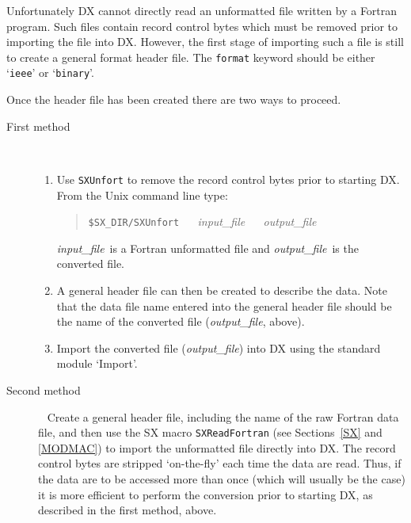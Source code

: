 Unfortunately DX cannot directly read an unformatted file written by
a Fortran program. Such files contain record control bytes which must
be  removed prior to importing the file into DX. However, the first
stage of importing such a file is still to create a general format
header file. The {\tt format} keyword should be either `{\tt ieee}'
or `{\tt binary}'.

Once the header file has been created there are two ways to proceed.

\pagebreak[4]
\begin{description}

  \item[First method] ~
  \begin{enumerate}

    \item Use {\tt SXUnfort} to remove the record control bytes prior
     to starting DX. From the Unix command line type:

    \begin{quote}
     {\tt \$SX\_DIR/SXUnfort} ~~ {\it input\_file} ~~ {\it output\_file}
    \end{quote}

     {\it input\_file}\, is a Fortran unformatted file and {\it
     output\_file}\, is the converted file.

    \item A general header file can then be created to describe the data.
     Note that the data file name entered into the general header
     file should be the name of the converted file ({\it{output\_file}},
     above).

    \item Import the converted file ({\it{output\_file}}) into DX using the
     standard module `Import'.

  \end{enumerate}

  \item[Second method] ~
  \newline Create a general header file, including the name of the raw
   Fortran data file, and then use the SX macro {\tt{SXReadFortran}}
   (see Sections~\ref{SX} and \ref{MODMAC}) to import the unformatted
   file directly into DX. The record control bytes are stripped
   `on-the-fly' each time the data are read. Thus, if the data are
   to be accessed more than once (which will usually be the case) it
   is more efficient to perform the conversion prior to starting DX,
   as described in the first method, above.

\end{description}

